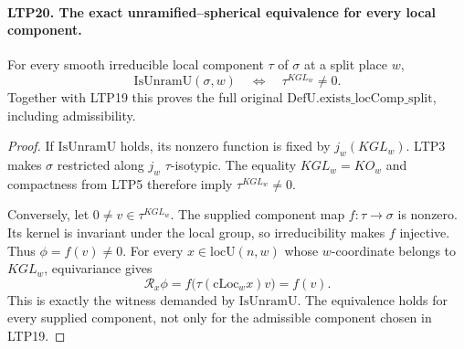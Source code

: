 \paragraph{LTP20. The exact unramified--spherical equivalence for every local component.}
\label{claim:LTP20}
For every smooth irreducible local component \(\tau\) of
\(\sigma\) at a split place \(w\),
\[
            \mathrm{IsUnramU}(\sigma,w)
                 \quad\Longleftrightarrow\quad
                   \tau^{KGL_w}\ne0 .
\]
Together with LTP19 this proves the full original
\(\mathrm{DefU.exists\_locComp\_split}\), including admissibility.
\begin{proof}
If \(\mathrm{IsUnramU}\) holds, its nonzero function is fixed
by \(j_w(KGL_w)\).  LTP3 makes \(\sigma\) restricted along
\(j_w\) \(\tau\)-isotypic.  The equality \(KGL_w=KO_w\) and
compactness from LTP5 therefore imply \(\tau^{KGL_w}\ne0\).

Conversely, let \(0\ne v\in\tau^{KGL_w}\).
The supplied component map \(f:\tau\to\sigma\) is nonzero.
Its kernel is invariant under the local group, so irreducibility
makes \(f\) injective.  Thus \(\phi=f(v)\ne0\).
For every \(x\in\mathrm{locU}(n,w)\) whose \(w\)-coordinate
belongs to \(KGL_w\), equivariance gives
\[
       \mathscr R_x\phi
                   =f\bigl(\tau(\mathrm{cLoc}_w x)v\bigr)
                   =f(v).
\]
This is exactly the witness demanded by \(\mathrm{IsUnramU}\).
The equivalence holds for every supplied component, not only
for the admissible component chosen in LTP19.
\end{proof}

